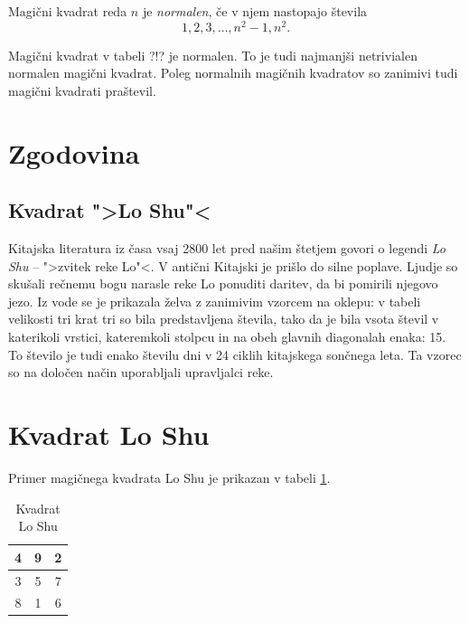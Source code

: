 \documentclass[a4paper,12pt]{article}
\begin{document}
   Magični kvadrat reda $n$ je \emph{normalen}, če v njem nastopajo števila
   \begin{equation}
      1, 2, 3, \ldots, n^2-1, n^2.
   \end{equation}

Magični kvadrat v tabeli ?!? je normalen.
To je tudi najmanjši netrivialen normalen magični kvadrat.
Poleg normalnih magičnih kvadratov so zanimivi tudi magični kvadrati praštevil.


\section{Zgodovina}

\subsection{Kvadrat ">Lo Shu"<}

Kitajska literatura iz časa vsaj 2800 let pred našim štetjem govori o legendi
\emph{Lo Shu} -- ">zvitek reke Lo"<. V antični Kitajski je prišlo do
silne poplave. Ljudje so skušali rečnemu bogu narasle reke Lo ponuditi daritev,
da bi pomirili njegovo jezo. Iz vode se je prikazala želva z zanimivim vzorcem
na oklepu: v tabeli velikosti tri krat tri so bila predstavljena števila, tako
da je bila vsota števil v katerikoli vrstici, kateremkoli stolpcu in na obeh
glavnih diagonalah enaka: 15. To število je tudi enako številu dni v 24 ciklih
kitajskega sončnega leta. Ta vzorec so na določen način uporabljali upravljalci
reke.

\section{Kvadrat Lo Shu}

Primer magičnega kvadrata Lo Shu je prikazan v tabeli \ref{table:loshu}.

\begin{table}[h]
\centering
\caption{Kvadrat Lo Shu}  %
\label{table:loshu}  %
\begin{tabular}{|c|c|c|}
\hline
4 & 9 & 2 \\\hline
3 & 5 & 7 \\\hline
8 & 1 & 6 \\\hline
\end{tabular}
\end{table}
\end{document}
